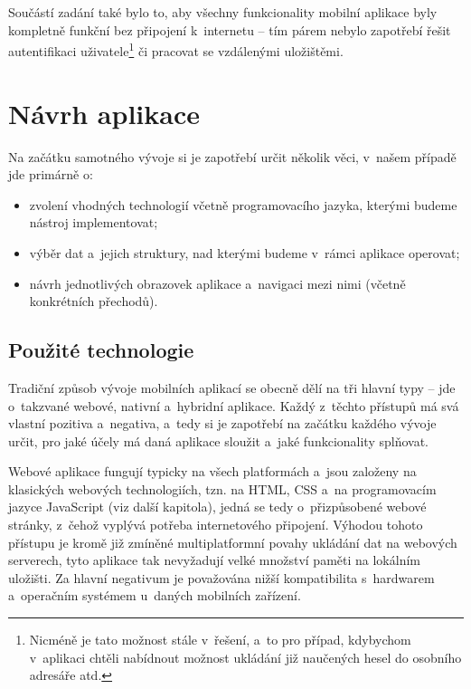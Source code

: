 Součástí zadání také bylo to, aby všechny funkcionality mobilní aplikace
byly kompletně funkční bez připojení k~internetu -- tím párem nebylo
zapotřebí řešit autentifikaci
uživatele\footnote{Nicméně je tato možnost stále v~řešení, a~to pro případ, kdybychom v~aplikaci chtěli nabídnout možnost ukládání již naučených hesel do osobního adresáře atd.}
či pracovat se vzdálenými uložištěmi.

\hypertarget{nuxe1vrh-aplikace}{%
\section{Návrh aplikace}\label{nuxe1vrh-aplikace}}

Na začátku samotného vývoje si je zapotřebí určit několik věci, v~našem
případě jde primárně o:

\begin{itemize}
\tightlist
\item
  zvolení vhodných technologií včetně programovacího jazyka, kterými
  budeme nástroj implementovat;
\item
  výběr dat a~jejich struktury, nad kterými budeme v~rámci aplikace
  operovat;
\item
  návrh jednotlivých obrazovek aplikace a~navigaci mezi nimi (včetně
  konkrétních přechodů).
\end{itemize}

\hypertarget{pouux17eituxe9-technologie}{%
\subsection{Použité technologie}\label{pouux17eituxe9-technologie}}

Tradiční způsob vývoje mobilních aplikací se obecně dělí na tři hlavní
typy -- jde o~takzvané webové, nativní a~hybridní aplikace. Každý
z~těchto přístupů má svá vlastní pozitiva a~negativa, a~tedy si je
zapotřebí na začátku každého vývoje určit, pro jaké účely má daná
aplikace sloužit a~jaké funkcionality splňovat.

Webové aplikace fungují typicky na všech platformách a~jsou založeny na
klasických webových technologiích, tzn. na HTML, CSS a~na programovacím
jazyce JavaScript (viz další kapitola), jedná se tedy o~přizpůsobené
webové stránky, z~čehož vyplývá potřeba internetového připojení. Výhodou
tohoto přístupu je kromě již zmíněné multiplatformní povahy ukládání dat
na webových serverech, tyto aplikace tak nevyžadují velké množství
paměti na lokálním uložišti. Za hlavní negativum je považována nižší
kompatibilita s~hardwarem a~operačním systémem u~daných mobilních
zařízení.

